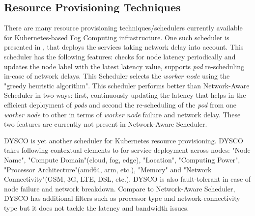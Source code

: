 \subsection{Resource Provisioning Techniques}
There are many resource provisioning techniques/schedulers currently available for Kubernetes-based Fog Computing infrastructure. One such scheduler is presented in \cite{Haja2019}, that deploys the services taking network delay into account. This scheduler\cite{Haja2019} has the following features: checks for node latency periodically and updates the node label with the latest latency value, supports \emph{pod} re-scheduling in-case of network delays. This Scheduler\cite{Haja2019} selects the \emph{worker node} using the "greedy heuristic algorithm". This scheduler\cite{Haja2019} performs better than Network-Aware Scheduler\cite{Santos2019} in two ways: first, continuously updating the latency that helps in the efficient deployment of \emph{pods} and second the re-scheduling of the \emph{pod} from one \emph{worker node} to other in terms of \emph{worker node} failure and network delay. These two features are currently not present in Network-Aware Scheduler.\par
DYSCO\cite{Mittermeier2018} is yet another scheduler for Kubernetes resource provisioning. DYSCO takes following contextual elements to for service deployment across nodes\cite{Mittermeier2018}: "Node Name", "Compute Domain"(cloud, fog, edge), "Location", "Computing Power", "Processor Architecture"(amd64, arm, etc.), "Memory" and "Network Connectivity"(GSM, 3G, LTE, DSL, etc.). DYSCO is also fault-tolerant in case of node failure and network breakdown\cite{Mittermeier2018}. Compare to Network-Aware Scheduler\cite{Santos2019}, DYSCO\cite{Mittermeier2018} has additional filters such as processor type and network-connectivity type but it does not tackle the latency and bandwidth issues. \par
